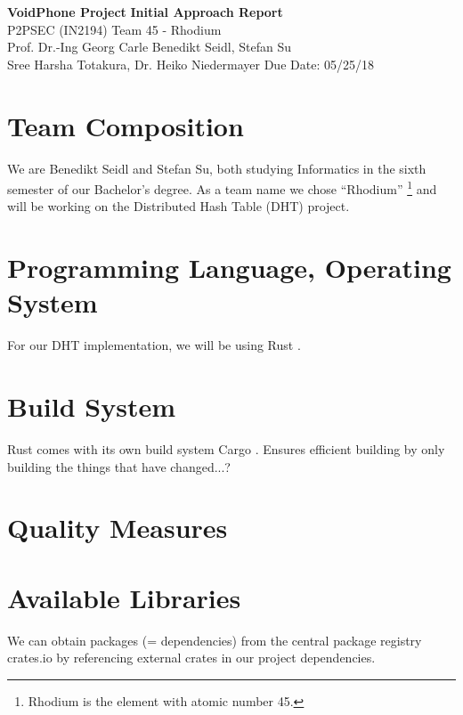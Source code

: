 \documentclass[a4paper, 11pt]{article}
\begin{document}
\noindent
\large\textbf{VoidPhone Project} \hfill \textbf{Initial Approach Report} \\
\normalsize P2PSEC (IN2194)  \hfill Team 45 - Rhodium\\
Prof. Dr.-Ing Georg Carle \hfill Benedikt Seidl, Stefan Su \\
Sree Harsha Totakura, Dr. Heiko Niedermayer \hfill Due Date: 05/25/18

\section*{Team Composition}
We are Benedikt Seidl and Stefan Su, both studying Informatics in the sixth semester of our Bachelor's degree. As a team name we chose ``Rhodium'' \footnote{Rhodium is the element with atomic number 45.} and will be working on the Distributed Hash Table (DHT) project.

\section*{Programming Language, Operating System}
For our DHT implementation, we will be using Rust \cite{Rust}.  

\section*{Build System}
Rust comes with its own build system Cargo \cite{Cargo} . Ensures efficient building by only building the things that have changed...? 

\section*{Quality Measures}
\lipsum[4]

\section*{Available Libraries}
We can obtain packages (= dependencies) from the central package registry crates.io \cite{Crates} by referencing external crates in our project dependencies.
\end{document}
